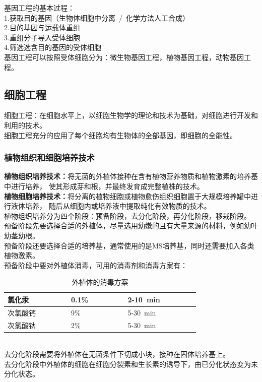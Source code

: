 \documentclass[UTF8]{ctexart}
\begin{document}
\newpage

    基因工程的基本过程：\\[3mm]
    1.获取目的基因（生物体细胞中分离~/~化学方法人工合成）\\[3mm]
    2.目的基因与运载体重组\\[3mm]
    3.重组分子导入受体细胞\\[3mm]
    4.筛选选含目的基因的受体细胞\\[5mm]
    基因工程可以按照受体细胞分为：微生物基因工程，植物基因工程，动物基因工程。\\

\subsection{细胞工程}
    细胞工程：在细胞水平上，以细胞生物学的理论和技术为基础，对细胞进行开发和利用的技术。\\[3mm]
    细胞工程充分的应用了每个细胞均有生物体的全部基因，即细胞的全能性。

\subsubsection{植物组织和细胞培养技术}
    \textbf{植物组织培养技术：}将无菌的外植体接种在含有植物营养物质和植物激素的培养基中进行培养，
    使其形成芽和根，并最终发育成完整植株的技术。\\[3mm]
    \textbf{植物细胞培养技术：}将分离的植物细胞或植物愈伤组织细胞置于大规模培养罐中进行液体培养，
    随后从细胞内或培养液中提取纯化有效物质的技术。\\[3mm]
    植物组织培养分为四个阶段：预备阶段，去分化阶段，再分化阶段，移栽阶段。\\[6mm]
    预备阶段先要选择合适的外植体，尽量选用幼嫩的且有大量来源的材料，例如幼叶幼茎幼根。\\[3mm]
    预备阶段还要选择合适的培养基，通常使用的是MS培养基，同时还需要加入各类植物激素。\\[3mm]
    预备阶段中要对外植体消毒，可用的消毒剂和消毒方案有：\vspace{5pt}
    \begin{table}[h]
        \begin{center}
            \begin{tabular}{l|l|l}
                \hline
                氯化汞~~~~~~~~&0.1\%~~~~~~~~&2-10~min~~~~~~~~\\ \hline
                次氯酸钙~~~~~~~~&9\%~~~~~~~~&5-30~min~~~~~~~~\\ \hline
                次氯酸钠~~~~~~~~&2\%~~~~~~~~&5-30~min~~~~~~~~\\ \hline
            \end{tabular}
            \caption{外植体的消毒方案}
        \end{center}
    \end{table}\\ 
    去分化阶段需要将外植体在无菌条件下切成小块，接种在固体培养基上。\\[3mm]
    去分化阶段中外植体的细胞在细胞分裂素和生长素的诱导下，由已分化状态变为未分化状态。
\end{document}
